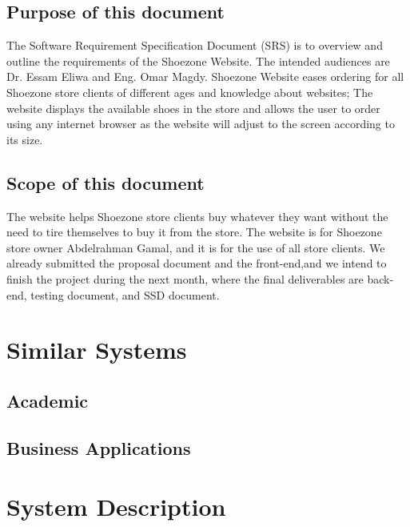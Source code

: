 \documentclass[12pt]{article}
\begin{document}
\subsection{Purpose of this document}
The Software Requirement Specification Document (SRS) is to overview and outline the requirements of the Shoezone Website. The intended audiences are Dr. Essam Eliwa and Eng. Omar Magdy. Shoezone Website eases ordering for all Shoezone store clients of different ages and knowledge about websites; The website displays the available shoes in the store and allows the user to order using any internet browser as the website will adjust to the screen according to its size.
\subsection{Scope of this document}
The website helps Shoezone store clients buy whatever they want without the need to tire themselves to buy it from the store. The website is for Shoezone store owner Abdelrahman Gamal, and it is for the use of all store clients.
We already submitted the proposal document and the front-end,and we intend to finish the project during the next month, where the final deliverables are back-end, testing document, and SSD document. 




\section{Similar Systems}
\subsection{Academic}

\subsection{Business Applications}
\section{System Description}
\end{document}
